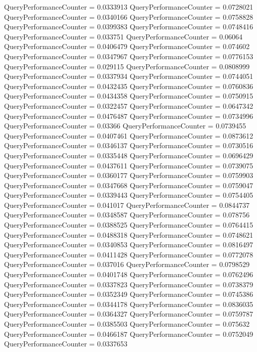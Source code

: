 \documentclass[9pt]{article}
\theoremstyle{plain}
\theoremstyle{definition}
\theoremstyle{remark}
\numberwithin{equation}{section}
\begin{document}
QueryPerformanceCounter  =  0.0333913
QueryPerformanceCounter  =  0.0728021
QueryPerformanceCounter  =  0.0340166
QueryPerformanceCounter  =  0.0758828
QueryPerformanceCounter  =  0.0399383
QueryPerformanceCounter  =  0.0748416
QueryPerformanceCounter  =  0.033751
QueryPerformanceCounter  =  0.06064
QueryPerformanceCounter  =  0.0406479
QueryPerformanceCounter  =  0.074602
QueryPerformanceCounter  =  0.0347967
QueryPerformanceCounter  =  0.0776153
QueryPerformanceCounter  =  0.029115
QueryPerformanceCounter  =  0.0808999
QueryPerformanceCounter  =  0.0337934
QueryPerformanceCounter  =  0.0744051
QueryPerformanceCounter  =  0.0432435
QueryPerformanceCounter  =  0.0760836
QueryPerformanceCounter  =  0.0434358
QueryPerformanceCounter  =  0.0750915
QueryPerformanceCounter  =  0.0322457
QueryPerformanceCounter  =  0.0647342
QueryPerformanceCounter  =  0.0476487
QueryPerformanceCounter  =  0.0734996
QueryPerformanceCounter  =  0.03366
QueryPerformanceCounter  =  0.0739455
QueryPerformanceCounter  =  0.0407461
QueryPerformanceCounter  =  0.0873612
QueryPerformanceCounter  =  0.0346137
QueryPerformanceCounter  =  0.0730516
QueryPerformanceCounter  =  0.0335448
QueryPerformanceCounter  =  0.0696429
QueryPerformanceCounter  =  0.0437611
QueryPerformanceCounter  =  0.0739075
QueryPerformanceCounter  =  0.0360177
QueryPerformanceCounter  =  0.0759903
QueryPerformanceCounter  =  0.0347668
QueryPerformanceCounter  =  0.0759047
QueryPerformanceCounter  =  0.0339443
QueryPerformanceCounter  =  0.0754405
QueryPerformanceCounter  =  0.041017
QueryPerformanceCounter  =  0.0844737
QueryPerformanceCounter  =  0.0348587
QueryPerformanceCounter  =  0.078756
QueryPerformanceCounter  =  0.0388525
QueryPerformanceCounter  =  0.0764415
QueryPerformanceCounter  =  0.0488318
QueryPerformanceCounter  =  0.0748621
QueryPerformanceCounter  =  0.0340853
QueryPerformanceCounter  =  0.0816497
QueryPerformanceCounter  =  0.0411428
QueryPerformanceCounter  =  0.0772078
QueryPerformanceCounter  =  0.037016
QueryPerformanceCounter  =  0.0798529
QueryPerformanceCounter  =  0.0401748
QueryPerformanceCounter  =  0.0762496
QueryPerformanceCounter  =  0.0337823
QueryPerformanceCounter  =  0.0738379
QueryPerformanceCounter  =  0.0352349
QueryPerformanceCounter  =  0.0745386
QueryPerformanceCounter  =  0.0344178
QueryPerformanceCounter  =  0.0836035
QueryPerformanceCounter  =  0.0364327
QueryPerformanceCounter  =  0.0759787
QueryPerformanceCounter  =  0.0385503
QueryPerformanceCounter  =  0.075632
QueryPerformanceCounter  =  0.0466187
QueryPerformanceCounter  =  0.0752049
QueryPerformanceCounter  =  0.0337653
\end{document}
